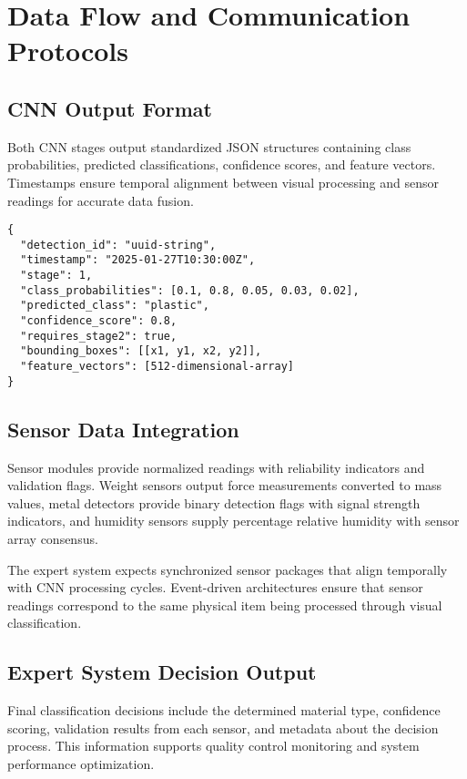 \documentclass[11pt, a4paper]{article}
\begin{document}
\section{Data Flow and Communication Protocols}

\subsection{CNN Output Format}
Both CNN stages output standardized JSON structures containing class probabilities, predicted classifications, confidence scores, and feature vectors. Timestamps ensure temporal alignment between visual processing and sensor readings for accurate data fusion.

\begin{lstlisting}[style=jsonstyle, caption=Example CNN Output JSON]
{
  "detection_id": "uuid-string",
  "timestamp": "2025-01-27T10:30:00Z",
  "stage": 1,
  "class_probabilities": [0.1, 0.8, 0.05, 0.03, 0.02],
  "predicted_class": "plastic",
  "confidence_score": 0.8,
  "requires_stage2": true,
  "bounding_boxes": [[x1, y1, x2, y2]],
  "feature_vectors": [512-dimensional-array]
}
\end{lstlisting}

\subsection{Sensor Data Integration}
Sensor modules provide normalized readings with reliability indicators and validation flags. Weight sensors output force measurements converted to mass values, metal detectors provide binary detection flags with signal strength indicators, and humidity sensors supply percentage relative humidity with sensor array consensus.

The expert system expects synchronized sensor packages that align temporally with CNN processing cycles. Event-driven architectures ensure that sensor readings correspond to the same physical item being processed through visual classification.

\subsection{Expert System Decision Output}
Final classification decisions include the determined material type, confidence scoring, validation results from each sensor, and metadata about the decision process. This information supports quality control monitoring and system performance optimization.
\end{document}
